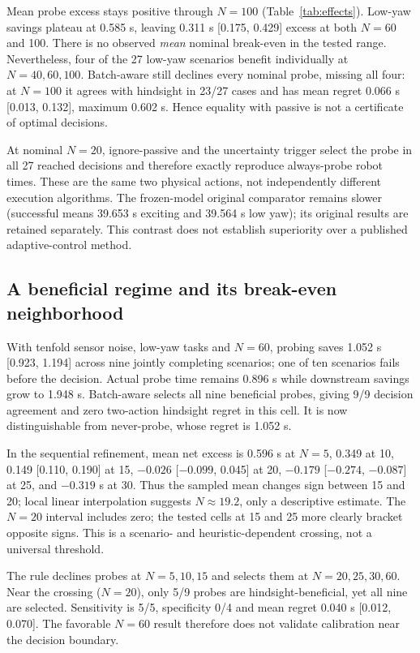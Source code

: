 \documentclass[10pt,twocolumn]{article}
\begin{document}
Mean probe excess stays positive through $N=100$ (Table~\ref{tab:effects}). Low-yaw savings plateau at 0.585 s, leaving 0.311 s [0.175, 0.429] excess at both $N=60$ and 100. There is no observed \emph{mean} nominal break-even in the tested range. Nevertheless, four of the 27 low-yaw scenarios benefit individually at $N=40,60,100$. Batch-aware still declines every nominal probe, missing all four: at $N=100$ it agrees with hindsight in 23/27 cases and has mean regret 0.066 s [0.013, 0.132], maximum 0.602 s. Hence equality with passive is not a certificate of optimal decisions.

At nominal $N=20$, ignore-passive and the uncertainty trigger select the probe in all 27 reached decisions and therefore exactly reproduce always-probe robot times. These are the same two physical actions, not independently different execution algorithms. The frozen-model original comparator remains slower (successful means 39.653 s exciting and 39.564 s low yaw); its original results are retained separately. This contrast does not establish superiority over a published adaptive-control method.

\subsection{A beneficial regime and its break-even neighborhood}
With tenfold sensor noise, low-yaw tasks and $N=60$, probing saves 1.052 s [0.923, 1.194] across nine jointly completing scenarios; one of ten scenarios fails before the decision. Actual probe time remains 0.896 s while downstream savings grow to 1.948 s. Batch-aware selects all nine beneficial probes, giving 9/9 decision agreement and zero two-action hindsight regret in this cell. It is now distinguishable from never-probe, whose regret is 1.052 s.

In the sequential refinement, mean net excess is 0.596 s at $N=5$, 0.349 at 10, 0.149 [0.110, 0.190] at 15, $-0.026$ [$-0.099$, 0.045] at 20, $-0.179$ [$-0.274$, $-0.087$] at 25, and $-0.319$ s at 30. Thus the sampled mean changes sign between 15 and 20; local linear interpolation suggests $N\approx19.2$, only a descriptive estimate. The $N=20$ interval includes zero; the tested cells at 15 and 25 more clearly bracket opposite signs. This is a scenario- and heuristic-dependent crossing, not a universal threshold.

The rule declines probes at $N=5,10,15$ and selects them at $N=20,25,30,60$. Near the crossing ($N=20$), only 5/9 probes are hindsight-beneficial, yet all nine are selected. Sensitivity is 5/5, specificity 0/4 and mean regret 0.040 s [0.012, 0.070]. The favorable $N=60$ result therefore does not validate calibration near the decision boundary.
\end{document}
